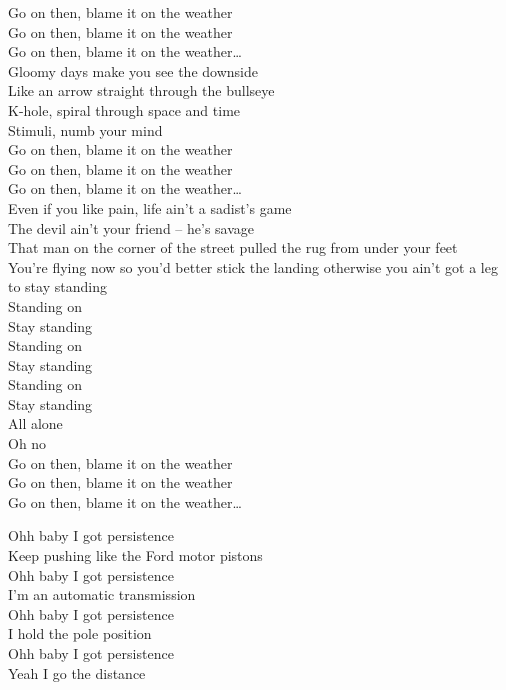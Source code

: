 Go on then, blame it on the weather \\
Go on then, blame it on the weather \\
Go on then, blame it on the weather… \\

Gloomy days make you see the downside \\
Like an arrow straight through the bullseye \\
K-hole, spiral through space and time \\
Stimuli, numb your mind \\

Go on then, blame it on the weather \\
Go on then, blame it on the weather \\
Go on then, blame it on the weather… \\

Even if you like pain, life ain't a sadist's game \\
The devil ain't your friend -- he's savage \\
That man on the corner of the street pulled the rug from under your feet \\
You're flying now so you'd better stick the landing otherwise you ain't got a leg to stay standing \\
Standing on \\

Stay standing \\
Standing on \\
Stay standing \\
Standing on \\
Stay standing \\
All alone \\
Oh no \\

Go on then, blame it on the weather \\
Go on then, blame it on the weather \\
Go on then, blame it on the weather… \\




Ohh baby I got persistence \\
Keep pushing like the Ford motor pistons \\
Ohh baby I got persistence \\
I'm an automatic transmission \\
Ohh baby I got persistence \\
I hold the pole position \\
Ohh baby I got persistence \\
Yeah I go the distance \\

